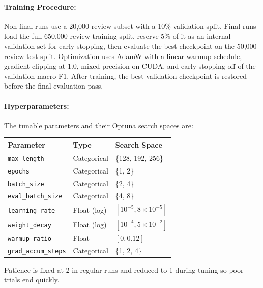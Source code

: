 \documentclass[12pt]{article}
\begin{document}
\paragraph{Training Procedure:}
Non final runs use a 20,000 review subset with a 10\% validation split. Final runs load the full 650,000-review training split, reserve 5\% of it as an internal validation set for early stopping, then evaluate the best checkpoint on the 50,000-review test split. Optimization uses AdamW with a linear warmup schedule, gradient clipping at 1.0, mixed precision on CUDA, and early stopping off of the validation macro F1. After training, the best validation checkpoint is restored before the final evaluation pass.

\newpage

\paragraph{Hyperparameters:}
The tunable parameters and their Optuna search spaces are:

\begin{table}[H]
    \centering
    \begin{tabular}{lll}
        \toprule
        Parameter & Type & Search Space \\
        \midrule
        \texttt{max\_length} & Categorical & \{128, 192, 256\} \\
        \texttt{epochs} & Categorical & \{1, 2\} \\
        \texttt{batch\_size} & Categorical & \{2, 4\} \\
        \texttt{eval\_batch\_size} & Categorical & \{4, 8\} \\
        \texttt{learning\_rate} & Float (log) & $[10^{-5}, 8 \times 10^{-5}]$ \\
        \texttt{weight\_decay} & Float (log) & $[10^{-4}, 5 \times 10^{-2}]$ \\
        \texttt{warmup\_ratio} & Float & $[0, 0.12]$ \\
        \texttt{grad\_accum\_steps} & Categorical & \{1, 2, 4\} \\
        \bottomrule
    \end{tabular}
\end{table}

Patience is fixed at 2 in regular runs and reduced to 1 during tuning so poor trials end quickly.
\end{document}
